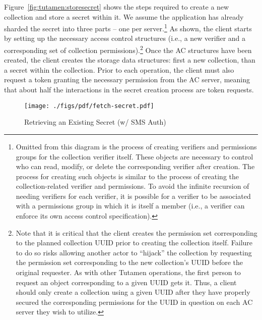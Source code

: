 Figure~\ref{fig:tutamen:storesecret} shows the steps required to
create a new collection and store a secret within it. We assume the
application has already sharded the secret into three parts -- one per
server.\footnote{Omitted from this diagram is the process of creating
  verifiers and permissions groups for the collection verifier
  itself. These objects are necessary to control who can read, modify,
  or delete the corresponding verifier after creation. The process for
  creating such objects is similar to the process of creating the
  collection-related verifier and permissions. To avoid the infinite
  recursion of needing verifiers for each verifier, it is possible for
  a verifier to be associated with a permissions group in which it is
  itself a member (i.e., a verifier can enforce its own access control
  specification).} As shown, the client starts by setting up the
necessary access control structures (i.e., a new verifier and a
corresponding set of collection permissions).\footnote{Note that it is
  critical that the client creates the permission set corresponding to
  the planned collection UUID prior to creating the collection
  itself. Failure to do so risks allowing another actor to ``hijack''
  the collection by requesting the permission set corresponding to the
  new collection's UUID before the original requester. As with other
  Tutamen operations, the first person to request an object
  corresponding to a given UUID gets it. Thus, a client should only
  create a collection using a given UUID after they have properly
  secured the corresponding permissions for the UUID in question on
  each AC server they wish to utilize.} Once the AC structures have
been created, the client creates the storage data structures: first a
new collection, than a secret within the collection. Prior to each
operation, the client must also request a token granting the necessary
permission from the AC server, meaning that about half the
interactions in the secret creation process are token requests.

\begin{figure}[th]
  \centering
  \texttt{[image: ./figs/pdf/fetch-secret.pdf]}
  \caption{Retrieving an Existing Secret (w/ SMS Auth)}
  \label{fig:tutamen:fetchsecret}
\end{figure}

